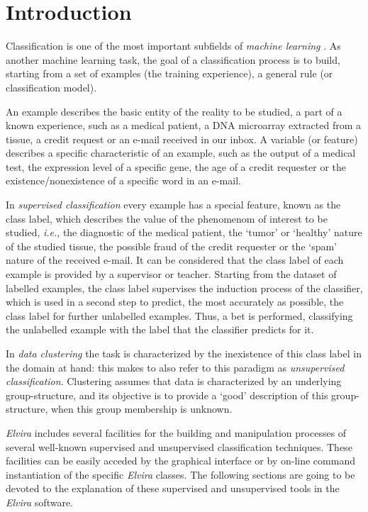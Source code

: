 \section{Introduction}

Classification is one of the most important subfields of {\em
machine learning} \cite{mitchell97}. As another machine learning
task, the goal of a classification process is to build, starting
from a set of examples (the training experience), a general rule
(or classification model).

An example describes the basic entity of the reality to be
studied, a part of a known experience, such as a medical patient,
a DNA microarray extracted from a tissue, a credit request or an
e-mail received in our inbox. A variable (or feature) describes a
specific characteristic of an example, such as the output of a
medical test, the expression level of a specific gene, the age of
a credit requester or the existence/nonexistence of a specific
word in an e-mail.

In {\em supervised classification} every example has a special
feature, known as the class label, which describes the value of
the phenomenom of interest to be studied, {\em i.e.}, the
diagnostic of the medical patient, the `tumor' or `healthy' nature
of the studied tissue, the possible fraud of the credit requester
or the `spam' nature of the received e-mail. It can be considered
that the class label of each example is provided by a supervisor
or teacher. Starting from the dataset of labelled examples, the
class label supervises the induction process of the classifier,
which is used in a second step to predict, the most accurately as
possible, the class label for further unlabelled examples. Thus, a
bet is performed, classifying the unlabelled example with the
label that the classifier predicts for it.

In {\em data clustering} the task is characterized by the
inexistence of this class label in the domain at hand: this makes
to also refer to this paradigm as {\em unsupervised
classification}. Clustering assumes that data is characterized by
an underlying group-structure, and its objective is to provide a
`good' description of this group-structure, when this group
membership is unknown.

{\em Elvira} includes several facilities for the building and
manipulation processes of several well-known supervised and
unsupervised classification techniques. These facilities can be
easily acceded by the graphical interface or by on-line command
instantiation of the specific {\em Elvira} classes. The following
sections are going to be devoted to the explanation of these
supervised and unsupervised tools in the {\em Elvira} software.
